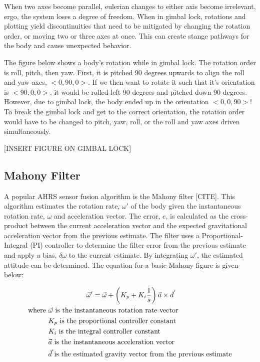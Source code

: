 \begin{fitbox}[frametitle=Aside: Gimbal Lock]
    When two axes become parallel, eulerian changes to either axis become irrelevant, ergo, the system loses a degree of freedom.
    When in gimbal lock, rotations and plotting yield discontinuities that need to be mitigated by changing the rotation order, or moving two or three axes at once.
    This can create stange pathways for the body and cause unexpected behavior.
    
    The figure below shows a body's rotation while in gimbal lock. The rotation order is roll, pitch, then yaw.
    First, it is pitched 90 degrees upwards to align the roll and yaw axes, $<0, 90, 0>$.
    If we then want to rotate it such that it's orientation is $<90, 0, 0>$, it would be rolled left 90 degrees and pitched down 90 degrees.
    However, due to gimbal lock, the body ended up in the orientation $<0, 0, 90>$!
    To break the gimbal lock and get to the correct orientation, the rotation order would have to be changed to pitch, yaw, roll, or the roll and yaw axes driven simultaneously.
    
    [INSERT FIGURE ON GIMBAL LOCK]
\end{fitbox}

\subsection{Mahony Filter}
A popular AHRS sensor fusion algorithm is the Mahony filter [CITE].
This algorithm estimates the rotation rate, $\omega'$ of the body given the instantaneous rotation rate, $\omega$ and acceleration vector.
The error, $e$, is calculated as the cross-product between the current acceleration vector and the expected gravitational acceleration vector from the previous estimate.
The filter uses a Proportional-Integral (PI) controller to determine the filter error from the previous estimate and apply a bias, $\delta\omega$ to the current estimate.
By integrating $\omega'$, the estimated attitude can be determined.
The equation for a basic Mahony figure is given below:

\begin{gather}
    \label{eq:mahony_filter}
    \vec{\omega}' = \vec{\omega} + \left(K_p + K_i\frac{1}{s}\right) \vec{a} \times \vec{d} \\
    \begin{aligned}
        \text{where } & \vec{\omega} \text{ is the instantaneous rotation rate vector} \\
        & K_p \text{ is the proportional controller constant} \\
        & K_i \text{ is the integral controller constant} \\
        & \vec{a} \text{ is the instantaneous acceleration vector} \\
        & \vec{d} \text{ is the estimated gravity vector from the previous estimate} \\
    \end{aligned} \notag
\end{gather}

